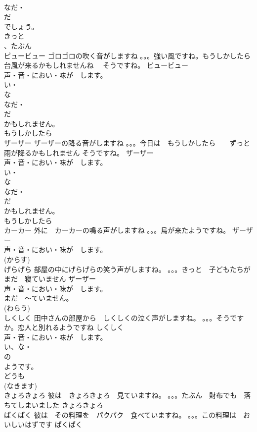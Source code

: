 \documentclass[8pt]{extreport}
\begin{document}
\begin{CJK}{UTF8}{min}
\\	なだ・
\\	だ
\\	でしょう。
\\	きっと
\\	、たぶん
\\	ピュービュー	ゴロゴロの吹く音がしますね 。。。強い風ですね。もうしかしたら　台風が来るかもしれませんね　 そうですね。	ピュービュー			
\\	声・音・におい・味が　します。
\\	い・
\\	な
\\	なだ・
\\	だ
\\	かもしれません。
\\	もうしかしたら
\\	ザーザー	ザーザーの降る音がしますね 。。。今日は　もうしかしたら　　ずっと雨が降るかもしれません そうですね。	ザーザー			
\\	声・音・におい・味が　します。
\\	い・
\\	な
\\	なだ・
\\	だ
\\	かもしれません。
\\	もうしかしたら
\\	カーカー	外に　カーカーの鳴る声がしますね 。。。烏が来たようですね。	ザーザー			
\\	声・音・におい・味が　します。
\\	(からす)	
\\	げらげら	部屋の中にげらげらの笑う声がしますね。 。。。きっと　子どもたちが　まだ　寝ていません	ザーザー			
\\	声・音・におい・味が　します。
\\	まだ　～ていません。
\\	(わらう)	
\\	しくしく	田中さんの部屋から　しくしくの泣く声がしますね。 。。。そうですか。恋人と別れるようですね	しくしく			
\\	声・音・におい・味が　します。
\\	い、な・
\\	の
\\	ようです。
\\	どうも
\\	(なきます)	
\\	きょろきょろ	彼は　きょろきょろ　見ていますね。 。。。たぶん　財布でも　落ちてしまいました	きょろきょろ			
\\	ぱくぱく	彼は　その料理を　パクパク　食べていますね。 。。。この料理は　おいしいはずです	ぱくぱく			

\end{CJK}
\end{document}
